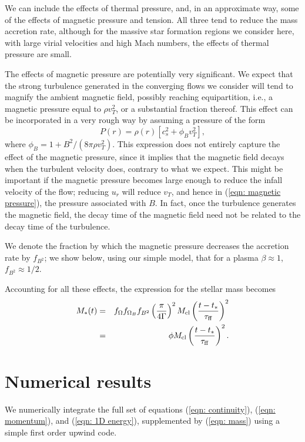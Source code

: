 \documentclass[iop,apj,numberedappendix]{emulateapj}
\newcommand       \phil[1]      {{\color{blue} #1}}
\newcommand       \be		{\begin{equation}}
\newcommand       \ee		{\end{equation}}
\newcommand       \bea          {\begin{eqnarray}}
\newcommand       \eea          {\end{eqnarray}}
\newcommand       \tff          {\tau_{\rm ff}}
\begin{document}
We can include the effects of thermal pressure, and, in an approximate
way, some of the effects of magnetic pressure and tension. All three
tend to reduce the mass accretion rate, although for the massive star
formation regions we consider here, with large virial velocities and
high Mach numbers, the effects of thermal pressure are small.

The effects of magnetic pressure are potentially very significant. We
expect that the strong turbulence generated in the converging flows we
consider will tend to magnify the ambient magnetic field, possibly
reaching equipartition, i.e., a magnetic pressure equal to $\rho
v_T^2$, or a substantial fraction thereof. This effect can be
incorporated in a very rough way by assuming a pressure of the form
%
\be \label{eqn: magnetic pressure} %
P(r)=\rho(r)\left[c_s^2+\phi_Bv_T^2\right],
\ee %
%
where $\phi_B=1+B^2/(8\pi\rho v_T^2)$. This expression does not
entirely capture the effect of the magnetic pressure, since it implies
that the magnetic field decays when the turbulent velocity does,
contrary to what we expect. This might be important if the magnetic
pressure becomes large enough to reduce the infall velocity of the
flow; reducing $u_r$ will reduce $v_T$, and hence in (\ref{eqn:
  magnetic pressure}), the pressure associated with $B$. In fact, once
the turbulence generates the magnetic field, the decay time of the
magnetic field need not be related to the decay time of the
turbulence.

We denote the fraction by which the magnetic pressure decreases the
accretion rate by $f_{B^2}$; we show below, using our simple model,
that for a plasma $\beta\approx1$, $f_{B^2}\approx 1/2$.

Accounting for all these effects, the expression for the stellar mass becomes
%
\bea  %
M_*(t)&=&f_\Omega f_{\Omega_B} f_{B^2}\left({\pi\over
  4\Gamma}\right)^2
M_{\rm  cl}\left({t-t_*\over\tff}\right)^2\\
&=&\phi M_{\rm  cl}\left({t-t_*\over\tff}\right)^2.
\eea  %
%

\section{Numerical results}\label{sec: numerics}
We numerically integrate the full set of equations
(\ref{eqn: continuity}), (\ref{eqn: momentum}), and (\ref{eqn: 1D
  energy}), supplemented by (\ref{eqn: mass}) \phil{using a simple first order upwind code}. 
\end{document}
